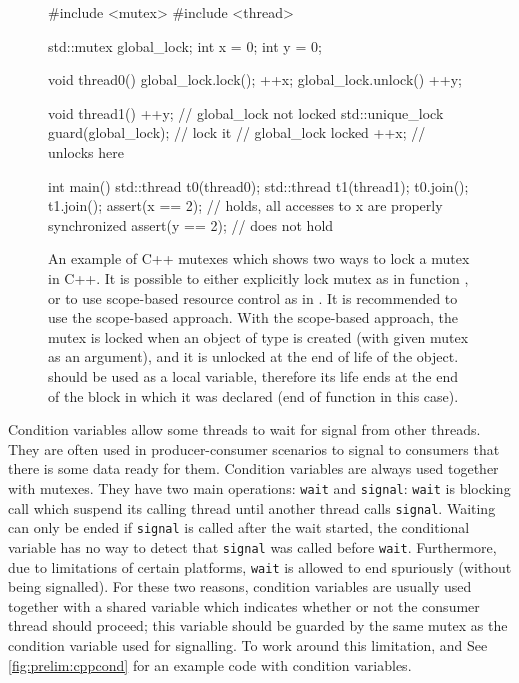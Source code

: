 \begin{figure}[tp]
    \begin{cppcode}
        #include <mutex>
        #include <thread>

        std::mutex global_lock;
        int x = 0;
        int y = 0;

        void thread0() {
            global_lock.lock();
            ++x;
            global_lock.unlock()
            ++y;
        }

        void thread1() {
            ++y; // global_lock not locked
            std::unique_lock guard(global_lock); // lock it
            // global_lock locked
            ++x;
        } // unlocks here

        int main() {
            std::thread t0(thread0);
            std::thread t1(thread1);
            t0.join(); t1.join();
            assert(x == 2); // holds, all accesses to x are properly synchronized
            assert(y == 2); // does not hold
        }
    \end{cppcode}
    \caption{An example of C++ mutexes which shows two ways to lock a mutex in
    C++.
    It is possible to either explicitly lock mutex as in function
    , or to use scope-based resource control as in
    .
    It is recommended to use the scope-based approach.
    With the scope-based approach, the mutex is locked when an object of type
     is created (with given mutex as an argument),
    and it is unlocked at the end of life of the  object.
     should be used as a local variable, therefore its
    life ends at the end of the block in which it was declared (end of function
     in this case).
    }\label{fig:prelim:cppmtx}
\end{figure}

Condition variables allow some threads to wait for signal from other threads.
They are often used in producer-consumer scenarios to signal to consumers that
there is some data ready for them.
Condition variables are always used together with mutexes.
They have two main operations: \texttt{wait} and \texttt{signal}: \texttt{wait}
is blocking call which suspend its calling thread until another thread calls
\texttt{signal}.
Waiting can only be ended if \texttt{signal} is called after the wait started,
the conditional variable has no way to detect that \texttt{signal} was called
before \texttt{wait}.
Furthermore, due to limitations of certain platforms, \texttt{wait} is allowed
to end spuriously (without being signalled).
For these two reasons, condition variables are usually used together with a
shared variable which indicates whether or not the consumer thread should
proceed; this variable should be guarded by the same mutex as the condition
variable used for signalling.
To work around this limitation, and 
See \autoref{fig:prelim:cppcond} for an example code with condition variables.

